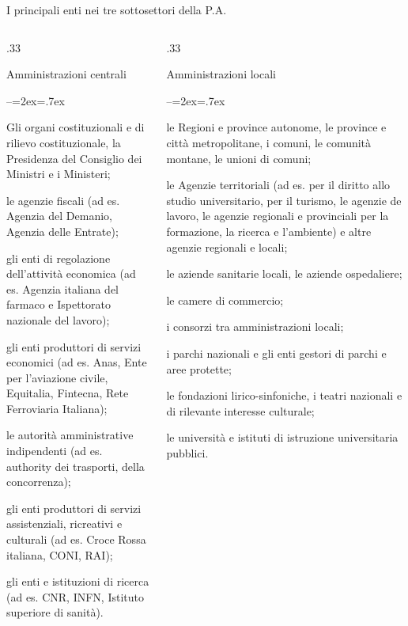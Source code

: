 \documentclass[aspectratio=64,11pt]{beamer}
\newenvironment{nobulletlist}{\begin{list}{--}{\itemsep=3pt\itemindent=2ex\labelsep=.7ex\leftmargin=0pt}}{\end{list}}
\begin{document}
\begin{frame}{I principali enti nei tre sottosettori della P.A.}
\vspace*{-5mm}
\fontsize{8}{8.5}\selectfont
\begin{columns}[t]
\begin{column}{.33\columnwidth}
\begin{block}{\footnotesize Amministrazioni centrali}
\begin{nobulletlist}
\item Gli organi costituzionali e di rilievo costituzionale, la Presidenza del Consiglio dei Ministri e i Ministeri;
\item le agenzie fiscali (ad es. Agenzia del Demanio, Agenzia delle Entrate);
\item gli enti di regolazione dell’attività economica (ad es. Agenzia italiana del farmaco e Ispettorato nazionale del lavoro);
\item gli enti produttori di servizi economici (ad es. Anas, Ente per l’aviazione civile, Equitalia, Fintecna, Rete Ferroviaria Italiana);
\item le autorità amministrative indipendenti (ad es. authority dei trasporti, della concorrenza);
\item gli enti produttori di servizi assistenziali, ricreativi e culturali (ad es. Croce Rossa italiana, CONI, RAI);
\item gli enti e istituzioni di ricerca (ad es. CNR, INFN, Istituto superiore di sa\-nità).
\end{nobulletlist}
\end{block}
\end{column}

\begin{column}{.33\columnwidth}
\begin{block}{\footnotesize Amministrazioni locali}
\begin{nobulletlist}
\item le Regioni e province autonome, le province e città metropolitane, i comuni, le comunità montane, le unioni di comuni;
\item le Agenzie territoriali (ad es. per il diritto allo studio universitario, per il turismo, le agenzie de lavoro, le agenzie regionali e provinciali per la formazione, la ricerca e l’ambiente) e altre agenzie regionali e locali;
\item le aziende sanitarie locali, le aziende ospedaliere;
\item le camere di commercio;
\item i consorzi tra amministrazioni locali;
\item i parchi nazionali e gli enti gestori di parchi e aree protette;
\item le fondazioni lirico-sinfoniche, i teatri nazionali e di rilevante interesse culturale;
\item le università e istituti di istruzione universitaria pubblici.
\end{nobulletlist}
\end{block}
\end{column}


\end{columns}
\end{frame}
\end{document}
